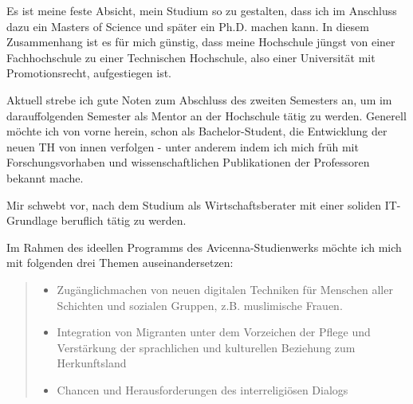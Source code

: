 \documentclass[a4paper]{article}
\begin{document}
Es ist meine feste Absicht, mein Studium so zu gestalten, dass ich im Anschluss dazu ein Masters of Science und später ein Ph.D. machen kann. In diesem Zusammenhang ist es für mich günstig, dass meine Hochschule jüngst von einer Fachhochschule zu einer Technischen Hochschule, also einer Universität mit Promotionsrecht, aufgestiegen ist.

Aktuell strebe ich gute Noten zum Abschluss des zweiten Semesters an, um im darauffolgenden Semester als Mentor an der Hochschule tätig zu werden. Generell möchte ich von vorne herein, schon als Bachelor-Student, die Entwicklung der neuen TH von innen verfolgen -  unter anderem indem ich mich früh mit Forschungsvorhaben und wissenschaftlichen Publikationen der Professoren bekannt mache.

Mir schwebt vor, nach dem Studium als Wirtschaftsberater mit einer soliden IT-Grundlage beruflich tätig zu werden.

Im Rahmen des ideellen Programms des Avicenna-Studienwerks möchte ich mich mit folgenden drei Themen auseinandersetzen:
%
\begin{quote}
%
\begin{itemize}

\item Zugänglichmachen von neuen digitalen Techniken für Menschen aller Schichten
und sozialen Gruppen, z.B. muslimische Frauen.

\item Integration von Migranten unter dem Vorzeichen der Pflege und Verstärkung
der sprachlichen und kulturellen Beziehung zum Herkunftsland

\item Chancen und Herausforderungen des interreligiösen Dialogs

\end{itemize}

\end{quote}
\end{document}
